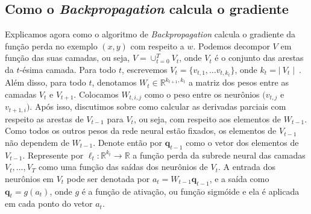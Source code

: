 \documentclass[
	12pt,				%
    oneside,			%
	a4paper,			%
	english,			%
	french,				%
	spanish,			%
	brazil,				%
	]{abntex2}
\begin{document}
        \subsection{Como o \emph{Backpropagation} calcula o gradiente}
            Explicamos agora como o algoritmo de \emph{Backpropagation} calcula o gradiente da função perda no exemplo $(x,y)$ com respeito a $w$. Podemos decompor $V$ em função das suas camadas, ou seja, $V = \cup_{t=0}^{T}V_t$, onde $V_t$ é o conjunto das arestas da $t$-ésima camada. Para todo $t$, escrevemos $V_t = \{v_{t,1},\dots v_{t,k_t}\}$, onde $k_t = \mid\ V_t\mid\ $. Além disso, para todo $t$, denotamos $W_t \in \mathbb{R}^{k_{t+1},k_t}$ a matriz dos pesos entre as camadas $V_t$ e $V_{t+1}$. Colocamos $W_{t,i,j}$ como o peso entre os neurônios $(v_{t,j}$ e $v_{t+1,i})$. Após isso, discutimos sobre como calcular as derivadas parciais com respeito as arestas de $V_{t-1}$ para $V_t$, ou seja, com respeito aos elementos de $W_{t-1}$. Como todos os outros pesos da rede neural estão fixados, os elementos de $V_{t-1}$ não dependem de $W_{t-1}$. Denote então por $\textbf{q}_{t-1}$ como o vetor dos elementos de $V_{t-1}$. Represente por $\ell_t: \mathbb{R}^{k_t} \to \mathbb{R}$ a função perda da subrede neural das camadas $V_t,\dots,V_T$ como uma função das saídas dos neurônios de $V_t$. A entrada dos neurônios em $V_t$ pode ser denotada por $a_t = W_{t-1}\textbf{q}_{t-1}$, e a saída como $\textbf{q}_t = g(a_t)$, onde $g$ é a função de ativação, ou função sigmóide e ela é aplicada em cada ponto do vetor $a_t$.
\end{document}
